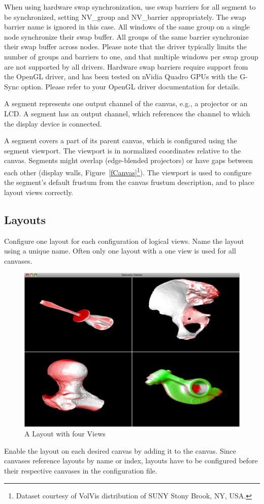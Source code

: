 \documentclass[10pt,a4]{scrartcl}
\newcommand{\fig}[1]{Figure~\ref{#1}}
\begin{document}
When using hardware swap synchronization, use swap barriers for all segment to
be synchronized, setting \textsf{NV\_group} and \textsf{NV\_barrier}
appropriately. The swap barrier name is ignored in this case. All windows of the
same group on a single node synchronize their swap buffer. All groups of the
same barrier synchronize their swap buffer across nodes. Please note that the
driver typically limits the number of groups and barriers to one, and that
multiple windows per swap group are not supported by all drivers. Hardware swap
barriers require support from the OpenGL driver, and has been tested on nVidia
Quadro GPUs with the G-Sync option. Please refer to your OpenGL driver
documentation for details.

A segment represents one output channel of the canvas, e.g., a projector
or an LCD. A segment has an output channel, which references the channel to
which the display device is connected.

A segment covers a part of its parent canvas, which is configured using the
segment viewport. The viewport is in normalized coordinates relative to the
canvas. Segments might overlap (edge-blended projectors) or have gaps between
each other (display walls, \fig{fCanvas}\footnote{Dataset courtesy of VolVis
  distribution of SUNY Stony Brook, NY, USA.}). The viewport is used to
configure the segment's default frustum from the canvas frustum description, and
to place layout views correctly.

\subsection{\label{sLayout}Layouts}

Configure one \textsf{layout} for each configuration of logical
views. Name the layout using a unique name. Often only one layout with a
one view is used for all canvases.

\begin{figure}
  \includegraphics[width=.382\textwidth]{images/layout.png}
  {\caption{\label{fLayout}A Layout with four Views}}
\end{figure}
Enable the layout on each desired canvas by adding it to the
canvas. Since canvases reference layouts by name or index, layouts have
to be configured before their respective canvases in the configuration
file.
\end{document}
